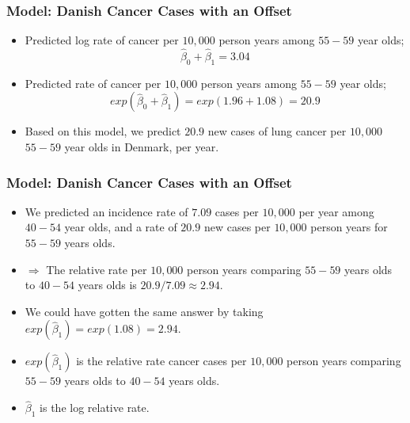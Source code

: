 \documentclass[10pt,xcolor={svgnames},t]{beamer}
\begin{document}
%
%
\begin{frame}
	\frametitle{Model: Danish Cancer Cases with an Offset}
	
	\begin{itemize}
		\item Predicted log rate of cancer per $10,000$ person years among $55-59$ year olds;
		\[ \hat{\beta}_0 + \hat{\beta}_1=3.04
		\]
		\item Predicted rate of cancer per $10,000$ person years among $55-59$ year olds;
		\[ exp(\hat{\beta}_0 + \hat{\beta}_1)=exp(1.96+1.08)=20.9
		\]
				\bigskip
		\item Based on this model, we predict $20.9$ new cases of lung cancer per $10,000$ $55-59$ year olds in Denmark, per year.
	\end{itemize}
	
	
\end{frame}
%
%
\begin{frame}
	\frametitle{Model: Danish Cancer Cases with an Offset}
	
	\begin{itemize}
		\item We predicted an incidence rate of $7.09$ cases per $10,000$ per year among $40-54$ year olds, and a rate of $20.9$ new cases per $10,000$ person years for $55-59$ years olds.
		\bigskip
		\item[] $\Rightarrow$ The relative rate per $10,000$ person years comparing $55-59$ years olds to $40-54$ years olds is $20.9/7.09 \approx 2.94$.
			\bigskip
		\item We could have gotten the same answer by taking $exp(\hat{\beta}_1)=exp(1.08)=2.94$.
			\bigskip
		\item $exp(\hat{\beta}_1)$ is the relative rate cancer cases per $10,000$ person years comparing $55-59$ years olds to $40-54$ years olds.
			\bigskip
		\item $\hat{\beta}_1$ is the log relative rate.  
	\end{itemize}
	
	
\end{frame}
%
%
\end{document}
